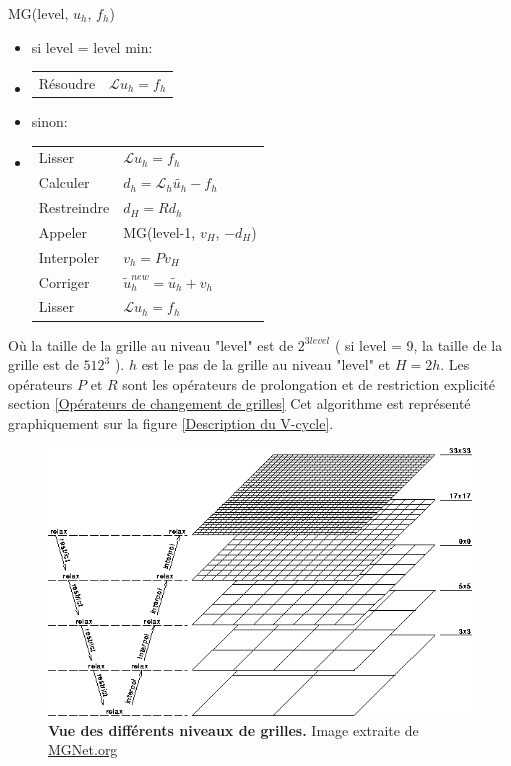MG(level, $u_h$, $f_h$)
\begin{itemize}	
\item 	si level = level min:
\item[]	\begin{tabular}{ll}
		Résoudre & $\mathcal{L} u_h = f_h $
		\end{tabular}
\item 	sinon:
\item[]	\begin{tabular}{ll}
		Lisser 		& 	$ \mathcal{L} u_h = f_h $\\
		Calculer	&	$ d_h = \mathcal{L}_h \tilde{u_h} - f_h $\\
		Restreindre	&	$ d_H = Rd_h$\\
		Appeler 	&	MG(level-1, $v_H$, $-d_H$) \\
		Interpoler	&	$ v_h = Pv_H$\\
		Corriger	&	$ \tilde{u}_h^{new} = \tilde{u_h} + v_h$\\
		Lisser		&	$ \mathcal{L} u_h = f_h $
		\end{tabular} 
\end{itemize}

Où la taille de la grille au niveau "level" est de $2^{3level}$ ( si level = 9, la taille de la grille est de $512^3$ ). $h$ est le pas de la grille au niveau "level" et $H = 2h$. Les opérateurs $P$ et $R$ sont les opérateurs de prolongation et de restriction explicité section \ref{Opérateurs de changement de grilles}
Cet algorithme est représenté graphiquement sur la figure \ref{Description du V-cycle}.


\begin{figure}[htbp]
\begin{center}
\includegraphics[scale=0.35]{img/02/multigrid.png}
\caption{\textbf{Vue des différents niveaux de grilles.} Image extraite de \href{http://MGNet.org}{MGNet.org} }
\label{Vue des différents niveaux de grilles}
\end{center}
\end{figure}	

